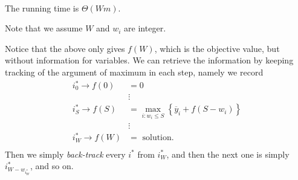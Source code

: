 \begin{problem}
\begin{answer}
\begin{itemize}
\[\begin{split}
			      \end{split}
		      \]
		      The running time is \(\Theta(Wm)\).
		      \begin{note}
			      Note that we assume \(W\) and \(w_{i}\) are integer.
		      \end{note}
		      Notice that the above only gives \(f(W)\), which is the objective value, but without information for variables. We can retrieve the
		      information by keeping tracking of the argument of maximum in each step, namely we record
		      \[
			      \begin{split}
				      i^{*}_{0 }\to f(0) &= 0\\
				      &\vdots\\
				      i^{*}_S \to f(S) &= \max_{i\colon w_{i}\leq S}\left\{ \overline{y}_{i} + f(S - w_{i})\right\}\\
				      &\vdots\\
				      i^{*}_W \to f(W) &= \text{ solution}.\\
			      \end{split}
		      \]
		      Then we simply \emph{back-track} every \(i^{*}\) from \(i^{*}_W\), and then the next one is simply \(i^{*}_{W - w_{i^{*}_W}}\), and
		      so on.
	\end{itemize}
\end{answer}
\end{problem}